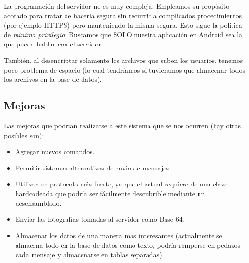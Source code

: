 La programación del servidor no es muy compleja. Empleamos su propósito acotado para tratar de hacerla segura sin recurrir a complicados 
procedimientos (por ejemplo HTTPS) pero manteniendo la misma segura. Esto sigue la política de \textit{minimo privilegio}: Buscamos que SOLO
nuestra aplicación en Android sea la que pueda hablar con el servidor.

También, al desencriptar solamente los archivos que suben los usuarios, tenemos poco problema 
de espacio (lo cual tendríamos si tuvieramos que almacenar todos los archivos en la base de
datos).

%

\subsection{Mejoras}

Las mejoras que podrían realizarse a este sistema que se nos ocurren (hay otras
posibles son):

\begin{itemize}
	\item Agregar nuevos comandos.
	\item Permitir sistemas alternativos de envio de mensajes.
	\item Utilizar un protocolo más fuerte, ya que el actual requiere de una
	clave hardcodeada que podría ser fácilmente descubrible mediante un 
	desensamblado.
	\item Enviar las fotografías tomadas al servidor como Base 64.
	\item Almacenar los datos de una manera mas interesantes (actualmente se
	almacena todo en la base de datos como texto, podría romperse en pedazos
	cada mensaje y almacenarse en tablas separadas).
\end{itemize}

